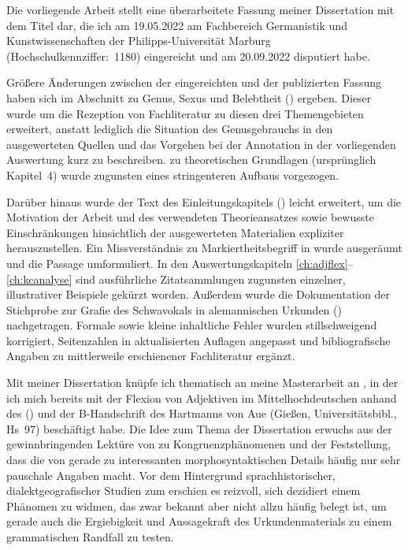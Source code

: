 \addchap{\lsPrefaceTitle}

Die vorliegende Arbeit stellt eine überarbeitete Fassung meiner Dissertation
mit dem Titel  dar, die ich am 19.05.2022 am Fachbereich
Germanistik und Kunstwissenschaften der Philipps-Universität Marburg
(Hochschulkennziffer:~1180) eingereicht und am 20.09.2022 disputiert habe.

Größere Änderungen zwischen der eingereichten und der publizierten Fassung
haben sich im Abschnitt zu Genus, Sexus und Belebtheit ()
ergeben. Dieser wurde um die Rezeption von Fachliteratur zu diesen drei
Themengebieten erweitert, anstatt lediglich die Situation des Genusgebrauchs in
den ausgewerteten Quellen und das Vorgehen bei der Annotation in der
vorliegenden Auswertung kurz zu beschreiben.  zu
theoretischen Grundlagen (ursprünglich Kapitel~4) wurde zugunsten eines
stringenteren Aufbaus vorgezogen.

Darüber hinaus wurde der Text des Einleitungskapitels ()
leicht erweitert, um die Motivation der Arbeit und des verwendeten
Theorieansatzes sowie bewusste Einschränkungen hinsichtlich der ausgewerteten
Materialien expliziter herauszustellen. Ein Missverständnis zu
 Markiertheitsbegriff in 
wurde ausgeräumt und die Passage umformuliert. In den Auswertungs\-kapiteln
\ref{ch:adjflex}--\ref{ch:kcanalyse} sind ausführliche Zitatsammlungen
zugunsten einzelner, illustrativer Beispiele gekürzt worden. Außerdem wurde die
Dokumentation der Stich\-probe zur Grafie des Schwa\-vokals in alemannischen
Urkunden () nachgetragen. Formale sowie kleine
inhaltliche Fehler wurden stillschweigend korrigiert, Seitenzahlen in
aktualisierten Auflagen angepasst und bibliografische Angaben zu mittlerweile
erschienener Fachliteratur ergänzt.

Mit meiner Dissertation knüpfe ich thematisch an meine Masterarbeit an
\autocite{becker2016}, in der ich mich bereits mit der Flexion von Adjektiven
im Mittelhochdeutschen anhand des  (\CAO) und der B-Handschrift des  Hartmanns von
Aue (Gießen, Universitätsbibl., Hs~97) beschäftigt habe. Die Idee zum Thema der
Dissertation erwuchs aus der gewinnbringenden Lektüre von \citet{corbett2006}
zu Kongruenz\-phänomenen und der Feststellung, dass die  von \citet{paul2007} gerade zu interessanten morpho\-syntaktischen
Details häufig nur sehr pauschale Angaben macht. Vor dem Hintergrund
sprach\-historischer, dialekt\-geografischer Studien zum \CAO{}
\autocite{beckerschallert2021,beckerschallert2022a, beckerschallert2022b}
erschien es reizvoll, sich dezidiert einem Phänomen zu widmen, das zwar bekannt
aber nicht allzu häufig belegt ist, um gerade auch die Ergiebigkeit und
Aussagekraft des Urkunden\-materials zu einem grammatischen Randfall zu testen.

